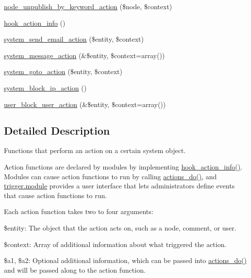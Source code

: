 \begin{DoxyCompactItemize}
\item 
\hyperlink{group__actions_gaa453e8f47436b80070213abd851535d0}{node\_\-unpublish\_\-by\_\-keyword\_\-action} (\$node, \$context)
\item 
\hyperlink{group__actions_ga3df26c5d6496c91fcd0edd8648023fb4}{hook\_\-action\_\-info} ()
\item 
\hyperlink{group__actions_gae09a4cd8054571b9ac3659adccfac574}{system\_\-send\_\-email\_\-action} (\$entity, \$context)
\item 
\hyperlink{group__actions_ga5dd09e03b155bd9ad1ef0dad464661e3}{system\_\-message\_\-action} (\&\$entity, \$context=array())
\item 
\hyperlink{group__actions_gae5230dbace638d69f196392fbc77e1af}{system\_\-goto\_\-action} (\$entity, \$context)
\item 
\hyperlink{group__actions_ga02b4d9ad9eadcc1b795e2f145cc06db9}{system\_\-block\_\-ip\_\-action} ()
\item 
\hyperlink{group__actions_gaaebd8bde2e44d7b334ba57e716fce110}{user\_\-block\_\-user\_\-action} (\&\$entity, \$context=array())
\end{DoxyCompactItemize}


\subsection{Detailed Description}
Functions that perform an action on a certain system object.

Action functions are declared by modules by implementing \hyperlink{group__actions_ga3df26c5d6496c91fcd0edd8648023fb4}{hook\_\-action\_\-info()}. Modules can cause action functions to run by calling \hyperlink{group__actions_gacfece93b3453da7c572057dde3453122}{actions\_\-do()}, and \hyperlink{trigger_8module}{trigger.module} provides a user interface that lets administrators define events that cause action functions to run.

Each action function takes two to four arguments:
\begin{DoxyItemize}
\item \$entity: The object that the action acts on, such as a node, comment, or user.
\item \$context: Array of additional information about what triggered the action.
\item \$a1, \$a2: Optional additional information, which can be passed into \hyperlink{group__actions_gacfece93b3453da7c572057dde3453122}{actions\_\-do()} and will be passed along to the action function. 
\end{DoxyItemize}

